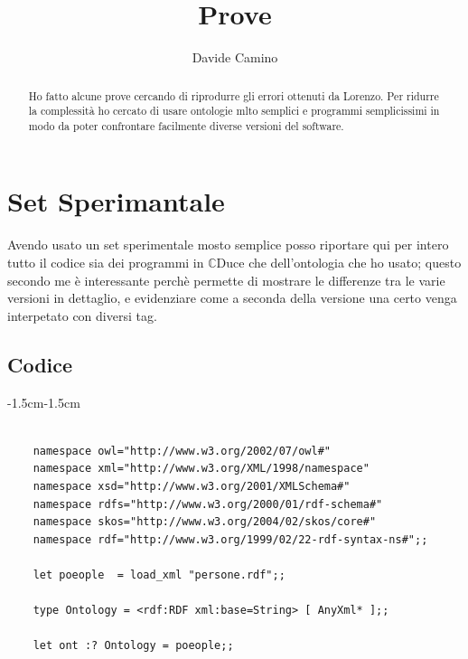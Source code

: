 \documentclass[]{article}
\title{Prove \cduce}
\author{Davide Camino}
\newcommand{\cduce}{$\mathbb {C}$Duce\xspace}
\begin{document}
\maketitle

\begin{abstract}
	Ho fatto alcune prove cercando di riprodurre gli errori ottenuti da Lorenzo. Per ridurre la complessità ho cercato di usare ontologie mlto semplici e programmi semplicissimi in modo da poter confrontare facilmente diverse versioni del software.
\end{abstract}

\section{Set Sperimantale}
Avendo usato un set sperimentale mosto semplice posso riportare qui per intero tutto il codice sia dei programmi in \cduce che dell'ontologia che ho usato; questo secondo me è interessante perchè permette di mostrare le differenze tra le varie versioni in dettaglio, e evidenziare come a seconda della versione una certo venga interpetato con diversi tag.

\subsection{Codice}

\begin{adjustwidth}{-1.5cm}{-1.5cm}	
	\begin{minipage}{\linewidth} 
		\begin{verbatim}
			
	namespace owl="http://www.w3.org/2002/07/owl#"
	namespace xml="http://www.w3.org/XML/1998/namespace"
	namespace xsd="http://www.w3.org/2001/XMLSchema#"
	namespace rdfs="http://www.w3.org/2000/01/rdf-schema#"
	namespace skos="http://www.w3.org/2004/02/skos/core#"
	namespace rdf="http://www.w3.org/1999/02/22-rdf-syntax-ns#";;
	
	let poeople  = load_xml "persone.rdf";;
	
	type Ontology = <rdf:RDF xml:base=String> [ AnyXml* ];;
	
	let ont :? Ontology = poeople;;
	
		\end{verbatim}
	\end{minipage}
\end{adjustwidth}
\end{document}
